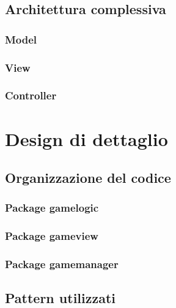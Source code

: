         \section[Architettura]{Architettura complessiva}\label{sec:architecture}
        
            \subsection{Model}\label{subsec:architecture:model}
                
             \subsection{View}\label{subsec:architecture:view}
                
             \subsection{Controller}\label{subsec:architecture:controller}
                

    \clearpage

    \chapter{Design di dettaglio}\label{ch:details}
        
        \section{Organizzazione del codice}\label{sec:organization}
            
            \subsection{Package gamelogic}\label{subsec:organization:gamelogic}
                
            \subsection{Package gameview}\label{subsec:organization:gameview}
                
            \subsection{Package gamemanager}\label{subsec:organization:gamemanager}
                
        \section{Pattern utilizzati}\label{sec:pattern}
            
